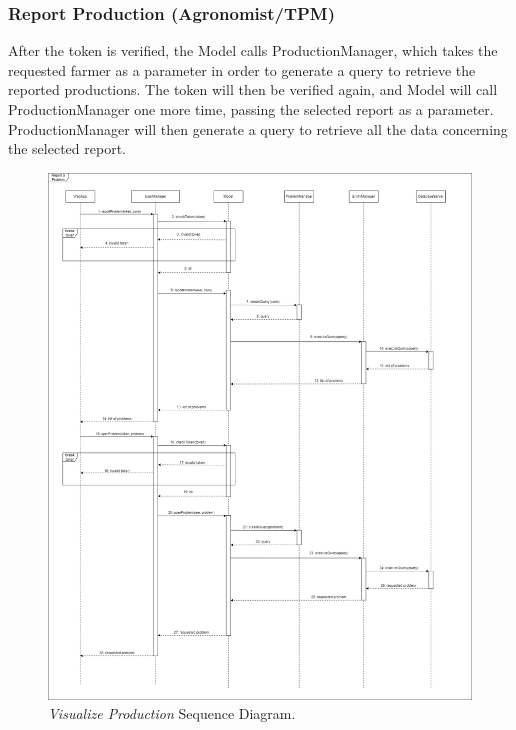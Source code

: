 \subsubsection{Report Production (Agronomist/TPM)}
After the token is verified, the Model calls ProductionManager, which takes the requested farmer as a parameter in order to generate a query to retrieve the reported productions. The token will then be verified again, and Model will call ProductionManager one more time, passing the selected report as a parameter. ProductionManager will then generate a query to retrieve all the data concerning the selected report.
\begin{figure}[H]
    \centering
    \includegraphics[width=\textwidth]{Images/Sequence Diagram/ReportProblemOthers.png}
    \caption{\textit{Visualize Production} Sequence Diagram.}
\end{figure}
